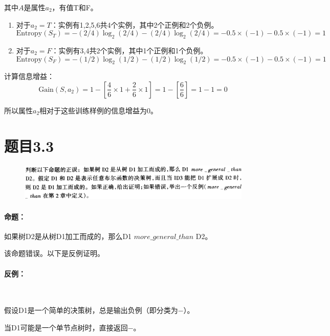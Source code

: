 \documentclass{article}
\begin{document}
    其中\(A\)是属性\(a_2\)，有值T和F。  

    \begin{enumerate}
    \item 对于\(a_2 = T\)：实例有1,2,5,6共4个实例，其中2个正例和2个负例。  
      \[
      \text{Entropy}(S_T) = - (2/4) \log_2 (2/4) - (2/4) \log_2 (2/4) = -0.5 \times (-1) - 0.5 \times (-1) = 1
      \]
      
    \item 对于\(a_2 = F\)：实例有3,4共2个实例，其中1个正例和1个负例。  
      \[
      \text{Entropy}(S_F) = - (1/2) \log_2 (1/2) - (1/2) \log_2 (1/2) = -0.5 \times (-1) - 0.5 \times (-1) = 1
      \]
    \end{enumerate}

    计算信息增益：  
    \[
    \text{Gain}(S, a_2) = 1 - \left[ \frac{4}{6} \times 1 + \frac{2}{6} \times 1 \right] = 1 - \left[ \frac{6}{6} \right] = 1 - 1 = 0
    \]  
    
    所以属性\(a_2\)相对于这些训练样例的信息增益为0。


\section{题目3.3}

    \begin{figure}[!h]
        \centering
        \includegraphics[width=1.2\linewidth]{image/3.3.png}
        \label{3.3}
    \end{figure}

    \paragraph{命题：}如果树D2是从树D1加工而成的，那么D1 $more\_general\_than$ D2。  
    
    该命题错误。以下是反例证明。

    \paragraph{反例：}~{}
    
    假设D1是一个简单的决策树，总是输出负例（即分类为$-$）。
    
    当D1可能是一个单节点树时，直接返回$-$。\\
    
\end{document}

